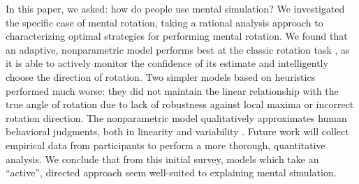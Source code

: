 \documentclass{article} %
\newcommand{\TODO}[1]{\textcolor{red}{[TODO: #1]}}
\begin{document}
In this paper, we asked: how do people use mental simulation?  We
investigated the specific case of mental rotation, taking a rational
analysis approach to characterizing optimal strategies for performing
mental rotation. We found that an adaptive, nonparametric model
performs best at the classic rotation task \cite{Shepard1971}, as it
is able to actively monitor the confidence of its estimate and
intelligently choose the direction of rotation. Two simpler models
based on heuristics performed much worse: they did not maintain the
linear relationship with the true angle of rotation due to lack of
robustness against local maxima or incorrect rotation direction. The
nonparametric model qualitatively approximates human behavioral
judgments, both in linearity \cite{Shepard1971} and variability
\cite{Just1976}. Future work will collect empirical data from
participants to perform a more thorough, quantitative analysis.  We
conclude that from this initial survey, models which take an
``active'', directed approach seem well-suited to explaining mental
simulation.





\renewcommand\refname{\normalsize{References}}

{\small }
\end{document}
